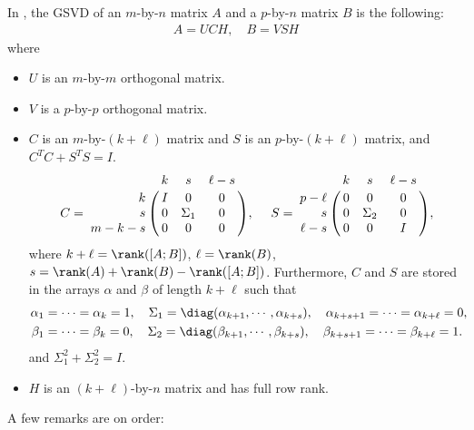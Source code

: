 In \cite{edelman2019gsvd}, the GSVD of an $m$-by-$n$ matrix $A$ 
and a $p$-by-$n$ matrix $B$ is the following: 
\begin{align} \label{eq:gsvdbyedelman}
A = UCH, \quad B = VSH
\end{align}
where 
\begin{itemize}
\item $U$ is an $m$-by-$m$ orthogonal matrix.

\item $V$ is a $p$-by-$p$ orthogonal matrix.

\item $C$ is an $m$-by-$(k+\ell)$ matrix and $S$ is 
an $p$-by-$(k+\ell)$ matrix, and  $C^T C + S^T S = I$. 
\[
C = \bordermatrix{ & k & s & \ell-s  \cr
            \hfill k & I & 0 & 0\cr
            \hfill s & 0 & \Sigma_1 & 0\cr
            \hfill m-k-s & 0 & 0 & 0}, \  \ \ \
S = \bordermatrix{ & k & s & \ell-s \cr
            \hfill p-\ell & 0 & 0 & 0\cr
            \hfill s & 0 & \Sigma_2 & 0\cr
            \hfill \ell-s & 0 & 0 & I}, 
\]
where 
$k+\ell = \rank([A; B])$, 
$\ell = \rank(B)$,  
$s = \rank(A) + \rank(B) - \rank([A; B])$. Furthermore, 
$C$ and $S$ are stored in the arrays $\alpha$ and $\beta$
of length $k+\ell$ such that 
\begin{align*} 
\alpha_1 & = \cdots = \alpha_k = 1, \quad 
\Sigma_1 = \diag(\alpha_{k+1}, \cdots, \alpha_{k+s}), \quad 
\alpha_{k+s+1} = \cdots = \alpha_{k+\ell} = 0, \\ 
\beta_1 & = \cdots = \beta_k = 0, \quad 
\Sigma_2 = \diag(\beta_{k+1}, \cdots, \beta_{k+s}), \quad 
\beta_{k+s+1} = \cdots = \beta_{k+\ell} = 1. 
\end{align*} 
and $\Sigma_1^2 + \Sigma_2^2 = I$.

\item $H$ is an $(k+\ell)$-by-$n$ matrix and has full row rank.

\end{itemize}

\noindent A few remarks are on order: 

